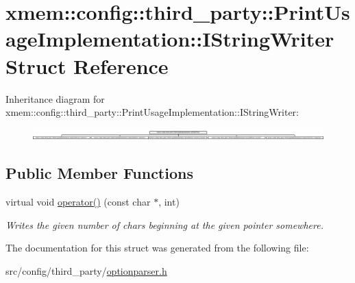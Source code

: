 \hypertarget{structxmem_1_1config_1_1third__party_1_1_print_usage_implementation_1_1_i_string_writer}{}\section{xmem\+:\+:config\+:\+:third\+\_\+party\+:\+:Print\+Usage\+Implementation\+:\+:I\+String\+Writer Struct Reference}
\label{structxmem_1_1config_1_1third__party_1_1_print_usage_implementation_1_1_i_string_writer}
Inheritance diagram for xmem\+:\+:config\+:\+:third\+\_\+party\+:\+:Print\+Usage\+Implementation\+:\+:I\+String\+Writer\+:\begin{figure}[H]
\begin{center}
\leavevmode
\includegraphics[height=0.440945cm]{structxmem_1_1config_1_1third__party_1_1_print_usage_implementation_1_1_i_string_writer}
\end{center}
\end{figure}
\subsection*{Public Member Functions}
\begin{DoxyCompactItemize}
\item 
\hypertarget{structxmem_1_1config_1_1third__party_1_1_print_usage_implementation_1_1_i_string_writer_aa391efef2dec3e18d614afb7e093a034}{}virtual void \hyperlink{structxmem_1_1config_1_1third__party_1_1_print_usage_implementation_1_1_i_string_writer_aa391efef2dec3e18d614afb7e093a034}{operator()} (const char $\ast$, int)\label{structxmem_1_1config_1_1third__party_1_1_print_usage_implementation_1_1_i_string_writer_aa391efef2dec3e18d614afb7e093a034}

\begin{DoxyCompactList}\small\item\em Writes the given number of chars beginning at the given pointer somewhere. \end{DoxyCompactList}\end{DoxyCompactItemize}


The documentation for this struct was generated from the following file\+:\begin{DoxyCompactItemize}
\item 
src/config/third\+\_\+party/\hyperlink{optionparser_8h}{optionparser.\+h}\end{DoxyCompactItemize}
